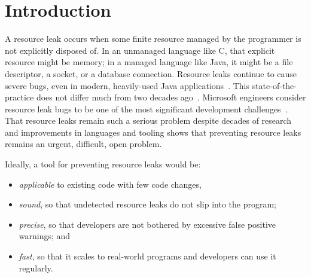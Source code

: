 \section{Introduction}
\label{sec:intro}


A resource leak occurs when some finite resource managed by the
programmer is not explicitly disposed of. In an unmanaged language
like C, that explicit resource might be memory; in a managed language
like Java, it might be a file descriptor, a socket, or a database
connection.  Resource leaks continue to cause severe bugs, even in
modern, heavily-used Java applications~\cite{ghanavati2020memory}.
This state-of-the-practice does not differ much from two decades
ago~\cite{WeimerN04}. 
Microsoft engineers consider resource leak bugs to be one of the most
significant development challenges~\cite{LoNZ2015}.  That
resource leaks remain such a serious problem despite decades of
research and improvements in languages and tooling shows that
preventing resource leaks remains an urgent, difficult, open problem.


Ideally, a tool for preventing resource leaks would be:
\begin{itemize}
\item \emph{applicable} to
  existing code with few code changes,
\item \emph{sound}, so that undetected resource leaks do not slip into
  the program;
\item \emph{precise}, so that developers are not bothered by excessive false positive
  warnings; and
\item \emph{fast}, so that it scales to real-world programs and
  developers can use it regularly.
\end{itemize}


